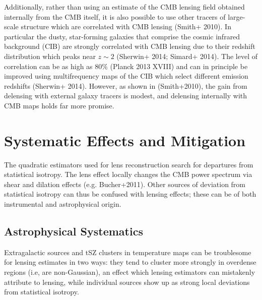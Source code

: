 Additionally, rather than using an estimate of the CMB lensing field obtained internally from the CMB itself, it is also possible to use other tracers of large-scale structure which are correlated with  CMB lensing (Smith+ 2010).  In particular the dusty, star-forming galaxies that comprise the cosmic infrared background (CIB) are strongly correlated with CMB lensing due to their redshift distribution which peaks near $z \sim 2$ (Sherwin+ 2014; Simard+ 2014).  The level of correlation can be as high as $80\%$ (Planck 2013 XVIII) and can in principle be improved using multifrequency maps of the CIB which select different emission redshifts (Sherwin+ 2014). However, as shown in (Smith+2010), the gain from delensing with external galaxy tracers is modest, and delensing internally with CMB maps holds far more promise.


\section{Systematic Effects and Mitigation}\label{syst}
The quadratic estimators used for lens reconstruction search for departures from statistical isotropy.  The lens effect locally changes the CMB power spectrum via shear and dilation effects (e.g. Bucher+2011).  Other sources of 
deviation from statistical isotropy can thus be confused with lensing effects; these can be of both instrumental and astrophysical origin.

\subsection{Astrophysical Systematics}\label{systAst}
	
Extragalactic sources and tSZ clusters in temperature maps can be troublesome for 
lensing estimates in two ways: they tend to cluster more
strongly in overdense regions (i.e, are non-Gaussian), an effect which
lensing estimators can mistakenly attribute to lensing, while individual
sources show up as strong local deviations from statistical isotropy.  


